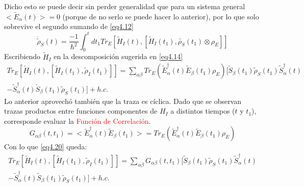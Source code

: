 \documentclass{book}
\begin{document}
Dicho esto se puede decir sin perder generalidad que para un sistema general $<\tilde{E}_\alpha(t)>=0$ (porque de no serlo se puede hacer lo anterior), por lo que solo sobrevive el segundo sumando de \ref{eq4.12}
\begin{equation}\label{eq4.19}\dot{\tilde{\rho}}_S(t)=\frac{-1}{\hslash^2}\int_0^t dt_1 Tr_E[\tilde{H}_I(t),[\tilde{H}_I(t_1),\tilde{\rho_S}(t_1)\otimes\rho_E]]\end{equation}
Escribiendo $\tilde{H}_I$ en la descomposición sugerida en \ref{eq4.14}
\begin{equation}\label{eq4.20}\begin{aligned} Tr_E[\tilde{H}_I(t),[\tilde{H}_I(t_1),\tilde{\rho}_I(t_1)]]=\sum_{\alpha\beta} Tr_E(\tilde{E}_\alpha^\dag (t)\tilde{E}_\beta(t_1)\rho_E)[\tilde{S}_\beta(t_1)\tilde{\rho}_S(t_1)\tilde{S}_\alpha^\dag(t)\\ -\tilde{S}_\alpha^\dag(t)\tilde{S}_\beta(t_1)\tilde{\rho}_S(t_1)]+h.c.\end{aligned}\end{equation}
Lo anterior aprovechó también que la traza es cíclica. Dado que se observan trazas productos entre funciones componentes de $H_I$ a distintos tiempos ($t$ y $t_1$), corresponde evaluar la \textcolor{red}{Función de Correlación}.
\begin{equation}\label{eq4.21}G_{\alpha\beta}(t,t_1)=<\tilde{E}_\alpha^\dag (t)\tilde{E}_\beta(t_1)>=Tr_E(\tilde{E}_\alpha^\dag (t)\tilde{E}_\beta(t_1)\rho_E)\end{equation}
Con lo que \ref{eq4.20} queda:
\begin{equation}\label{eq4.22}\begin{aligned} Tr_E[\tilde{H}_I(t),[\tilde{H}_I(t_1),\tilde{\rho}_I(t_1)]]=\sum_{\alpha\beta}     G_{\alpha\beta}(t,t_1)[\tilde{S}_\beta(t_1)\tilde{\rho}_S(t_1)\tilde{S}_\alpha^\dag(t)\\ -\tilde{S}_\alpha^\dag(t)\tilde{S}_\beta(t_1)\tilde{\rho}_S(t_1)]+h.c.\end{aligned}\end{equation}
\end{document}
